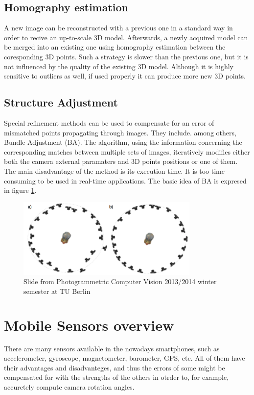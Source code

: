 \subsection{Homography estimation}
A new image can be reconstructed with a previous one in a standard way in order to recive an up-to-scale 3D model. Afterwards, a newly acquired model can be merged into an existing one using homography estimation between the coresponding 3D points. Such a strategy is slower than the previous one, but it is not influenced by the quality of the existing 3D model. Although it is highly sensitive to outliers as well, if used properly it can produce more new 3D points.
\subsection{Structure Adjustment}
Special refinement methods can be used to compensate for an error of mismatched points propagating through images. They include. among others, Bundle Adjustment (BA). The algorithm, using the information concerning the corresponding matches between multiple sets of images, iteratively modifies either both the camera external paramaters and 3D points positions or one of them\cite{website:bundle-adjustment}. The main disadvantage of the method is its execution time. It is too time-consuming to be used in real-time applications. The basic idea of BA is expresed in figure \ref{fig:BundleAdjustment}.
\begin{figure}[p]
    \centering
    \includegraphics[width=0.8\textwidth]{BundleAdjustment}
    \caption{Slide from Photogrammetric Computer Vision 2013/2014 winter semester at TU Berlin}
    \label{fig:BundleAdjustment}
\end{figure}
\section{Mobile Sensors overview\cite{website:androidSensorOverview}}
There are many sensors available in the nowadays smartphones, such as accelerometer, gyroscope, magnetometer, barometer, GPS, etc. All of them have their advantages and disadvanteges, and thus the errors of some might be compensated for with the strengths of the others in otrder to, for example, accuretely compute camera rotation angles.
